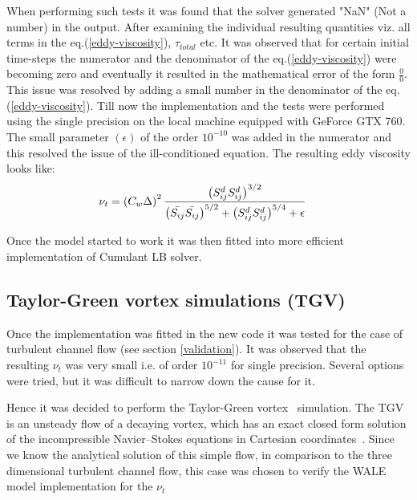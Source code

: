 When performing such tests it was found that the solver generated "NaN" (Not a number) in the output. After examining the individual resulting quantities viz. all terms in the eq.(\ref{eddy-viscosity}), $\tau_{total}$ etc. It was observed that for certain initial time-steps the numerator and the denominator of the eq.(\ref{eddy-viscosity}) were becoming zero and eventually it resulted in the mathematical error of the form $\frac{0}{0}$.\\
This issue was resolved by adding a small number in the denominator of the eq.(\ref{eddy-viscosity}). Till now the implementation and the tests were performed using the single precision on the local machine equipped with GeForce GTX 760. The small parameter $\left(\epsilon\right)$ of the order $10^{-10}$ was added in the numerator and this resolved the issue of the ill-conditioned equation. The resulting eddy viscosity looks like:
%
\begin{equation}
\label{mod eddy visc}
\begin{split}
{\nu_t} &= \left({C_w}{\Delta}\right)^{2} \frac{\left({S_{ij}^{d}}{S_{ij}^{d}}\right)^{3/2}}{\left(\bar{S_{ij}} \bar{S_{ij}}\right)^{5/2} + {\left({S_{ij}^{d}}{S_{ij}^{d}}\right)^{5/4}} + \epsilon} 
\end{split}
\end{equation}
%

Once the model started to work it was then fitted into more efficient implementation of Cumulant LB solver. 
\subsection{Taylor-Green vortex simulations (TGV)}

Once the implementation was fitted in the new code it was tested for the case of turbulent channel flow (see section \ref{validation}). It was observed that the resulting $\nu_t$ was very small i.e. of order $10^{-11}$ for single precision. Several options were tried, but it was difficult to narrow down the cause for it. 

Hence it was decided to perform the Taylor-Green vortex~\cite{taylor:green} simulation. The TGV is an unsteady flow of a decaying vortex, which has an exact closed form solution of the incompressible Navier–Stokes equations in Cartesian coordinates~\cite{wiki:tgv}. Since we know the analytical solution of this simple flow, in comparison to the three dimensional turbulent channel flow, this case was chosen to verify the WALE model implementation for the $\nu_t$

